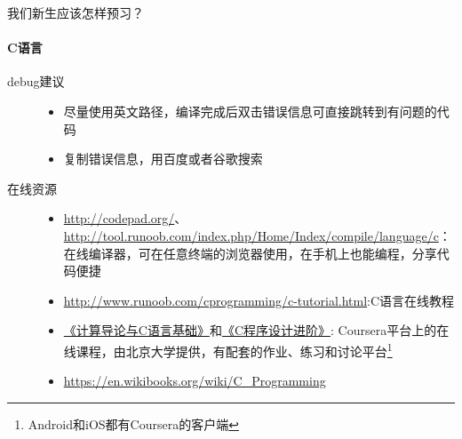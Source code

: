 \documentclass[xcolor={usenames,dvipsnames}]{beamer}
\begin{document}
\begin{frame}{我们新生应该怎样预习？}
\framesubtitle{C语言}
\begin{description}
    \item[debug建议\faCommentingO]
    \begin{itemize}
    \item 尽量使用英文路径，编译完成后双击错误信息可直接跳转到有问题的代码
    \item 复制错误信息，用百度或者谷歌搜索
    \end{itemize}
    \item[在线资源\faExternalLink] \begin{itemize}
    \item \faLink\url{http://codepad.org/}、\faLink\url{http://tool.runoob.com/index.php/Home/Index/compile/language/c}：在线编译器，可在任意终端的浏览器使用，在手机上也能编程，分享代码便捷
    \item \faLink\url{http://www.runoob.com/cprogramming/c-tutorial.html}:C语言在线教程
    \item \href{https://www.coursera.org/learn/jisuanji-biancheng}{《计算导论与C语言基础》}和\href{https://www.coursera.org/learn/c-chengxu-sheji}{《C程序设计进阶》}: Coursera平台上的在线课程，由北京大学提供，有配套的作业、练习和讨论平台\footnote{Android和iOS都有Coursera的客户端}
    \item \faLink\url{https://en.wikibooks.org/wiki/C_Programming}
    \end{itemize}
\end{description}
\end{frame}
\end{document}
